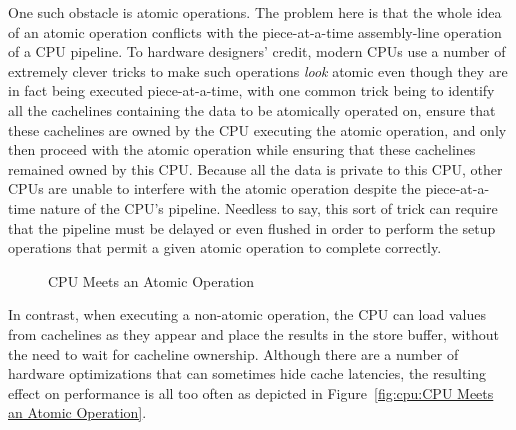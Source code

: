 One such obstacle is atomic operations.
The problem here is that the whole idea of an atomic operation conflicts with
the piece-at-a-time assembly-line operation of a CPU pipeline.
To hardware designers' credit, modern CPUs use a number of extremely clever
tricks to make such operations \emph{look} atomic even though they
are in fact being executed piece-at-a-time,
with one common trick being to identify all the cachelines containing the
data to be atomically operated on,
ensure that these cachelines are owned by the CPU executing the
atomic operation, and only then proceed with the atomic operation
while ensuring that these cachelines remained owned by this CPU\@.
Because all the data is private to this CPU, other CPUs are unable to
interfere with the atomic operation despite the piece-at-a-time nature
of the CPU's pipeline.
Needless to say, this sort of trick can require that
the pipeline must be delayed or even flushed in order to
perform the setup operations that
permit a given atomic operation to complete correctly.

\begin{figure}[htb]
\centering
{}
\caption{CPU Meets an Atomic Operation}
\end{figure}

In contrast, when executing a non-atomic operation, the CPU can load
values from cachelines as they appear and place the results in the
store buffer, without the need to wait for cacheline ownership.
Although there are a number of hardware optimizations that can sometimes
hide cache latencies, the resulting effect on performance is all too
often as depicted in
Figure~\ref{fig:cpu:CPU Meets an Atomic Operation}.

